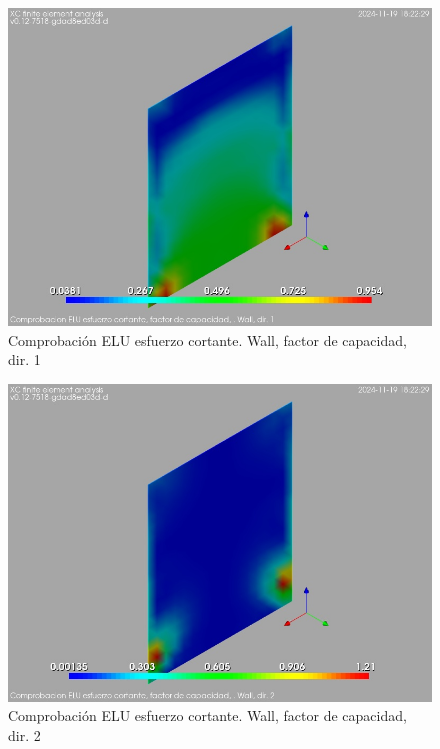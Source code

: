 \begin{figure}[ht]
\begin{center}
\includegraphics[width=\linewidth]{results/graphics/shearULS/wallCFSect1}
\caption{Comprobación ELU esfuerzo cortante. Wall, factor de capacidad, dir. 1}
\label{ULS_shearResistancewallCFSect1}
\end{center}
\end{figure}
\begin{figure}[ht]
\begin{center}
\includegraphics[width=\linewidth]{results/graphics/shearULS/wallCFSect2}
\caption{Comprobación ELU esfuerzo cortante. Wall, factor de capacidad, dir. 2}
\label{ULS_shearResistancewallCFSect2}
\end{center}
\end{figure}
